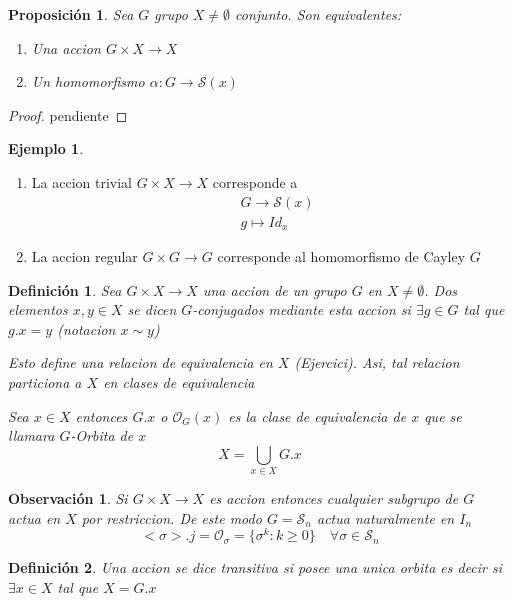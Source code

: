 \documentclass[10pt]{extarticle}
\theoremstyle{break}
\newtheorem{proposition}{Proposición}
\newtheorem*{remark}{Observación}
\newtheorem{definition}{Definición}[section]
\theoremstyle{definition}
\newtheorem{example}{Ejemplo}[section]
\begin{document}
\begin{proposition}
	Sea $G$ grupo $X\neq\emptyset$ conjunto. Son equivalentes:
	\begin{enumerate}
		\item Una accion $G\times X \longrightarrow X$
		\item Un homomorfismo $\alpha : G\rightarrow \mathcal{S} (x)$
	\end{enumerate}\end{proposition}\begin{proof}
pendiente
\end{proof}

\begin{example}
	\begin{enumerate}
		\item La accion trivial $G\times X\rightarrow X$ corresponde a
			\begin{align} 
				&G\longrightarrow \mathcal{S} (x)\nonumber\\
				&g\longmapsto Id_{x}\nonumber
			\end{align}
		\item La accion regular $G\times G\longrightarrow G$ corresponde al homomorfismo de Cayley $G$
	\end{enumerate}
\end{example}

\begin{definition}
	Sea $G\times X \longrightarrow X$ una accion de un grupo $G$ en $X\neq\emptyset$. Dos elementos $x,y\in X $ se dicen $G$-conjugados mediante esta accion si $\exists g\in G $ tal que $g.x=y$ (notacion $x\sim y$)

	Esto define una relacion de equivalencia en $X$ (Ejercici). Asi, tal relacion particiona a $X$ en clases de equivalencia

	Sea $x\in X $ entonces $G.x$ o $\mathcal{O}_{G}(x)$ es la clase de equivalencia de $x$ que se llamara $G$-Orbita de $x$ $$X=\bigcup_{x\in X }G.x $$
\end{definition}

\begin{remark}
	Si $G\times X \longrightarrow X$ es accion entonces cualquier subgrupo de $G$ actua en $X$ por restriccion. De este modo $G=\mathcal{S}_{n}$ actua naturalmente en $I_{n}$ 
	$$<\sigma>.j=\mathcal{O}_{\sigma}=\{\sigma^{k}:k\geq 0\}\quad \forall\sigma \in\mathcal{S}_{n} $$ 
\end{remark}

\begin{definition}
	Una accion se dice transitiva si posee una unica orbita es decir si $\exists x\in X $ tal que $X=G.x$
\end{definition}
\end{document}
